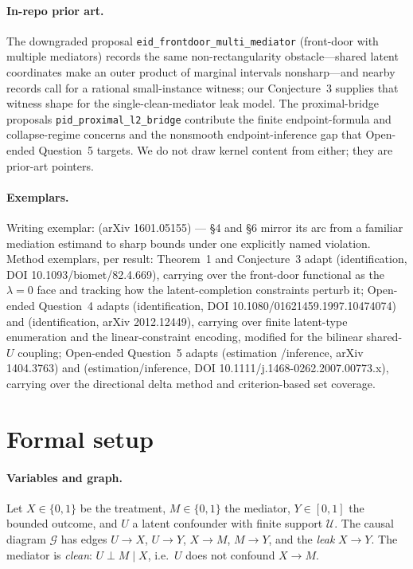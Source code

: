\documentclass[11pt]{article}
\theoremstyle{definition}
\theoremstyle{plain}
\theoremstyle{remark}
\begin{document}
\paragraph{In-repo prior art.} The downgraded proposal \texttt{eid\_frontdoor\_multi\_mediator} (front-door
with multiple mediators) records the same non-rectangularity obstacle---shared latent coordinates make an
outer product of marginal intervals nonsharp---and nearby records call for a rational small-instance
witness; our Conjecture~3 supplies that witness shape for the single-clean-mediator leak model. The
proximal-bridge proposals \texttt{pid\_proximal\_l2\_bridge} contribute the finite endpoint-formula and
collapse-regime concerns and the nonsmooth endpoint-inference gap that Open-ended Question~5 targets. We do
not draw kernel content from either; they are prior-art pointers.

\paragraph{Exemplars.} Writing exemplar: \citet{DingVanderWeele2016SharpMediationSensitivity} (arXiv
1601.05155) --- \S4 and \S6 mirror its arc from a familiar mediation estimand to sharp bounds under one
explicitly named violation. Method exemplars, per result: Theorem~1 and Conjecture~3 adapt
\citet{Pearl1995CausalDiagrams} (identification, DOI 10.1093/biomet/82.4.669), carrying over the front-door
functional as the $\lambda=0$ face and tracking how the latent-completion constraints perturb it;
Open-ended Question~4 adapts \citet{BalkePearl1997Bounds} (identification, DOI 10.1080/01621459.1997.10474074)
and \citet{FinkelsteinAdamsSariaShpitser2020MeasurementError} (identification, arXiv 2012.12449), carrying over
finite latent-type enumeration and the linear-constraint encoding, modified for the bilinear shared-$U$
coupling; Open-ended Question~5 adapts \citet{FangSantos2019DirectionallyDifferentiable} (estimation
/inference, arXiv 1404.3763) and \citet{ChernozhukovHongTamer2007ParameterSets} (estimation/inference, DOI
10.1111/j.1468-0262.2007.00773.x), carrying over the directional delta method and criterion-based set
coverage.

\section{Formal setup}
\label{sec:setup}
\paragraph{Variables and graph.} Let $X\in\{0,1\}$ be the treatment, $M\in\{0,1\}$ the mediator,
$Y\in[0,1]$ the bounded outcome, and $U$ a latent confounder with finite support $\mathcal U$. The causal
diagram $\mathcal G$ has edges $U\to X$, $U\to Y$, $X\to M$, $M\to Y$, and the \emph{leak} $X\to Y$. The
mediator is \emph{clean}: $U\perp M\mid X$, i.e.\ $U$ does not confound $X\to M$.
\end{document}
